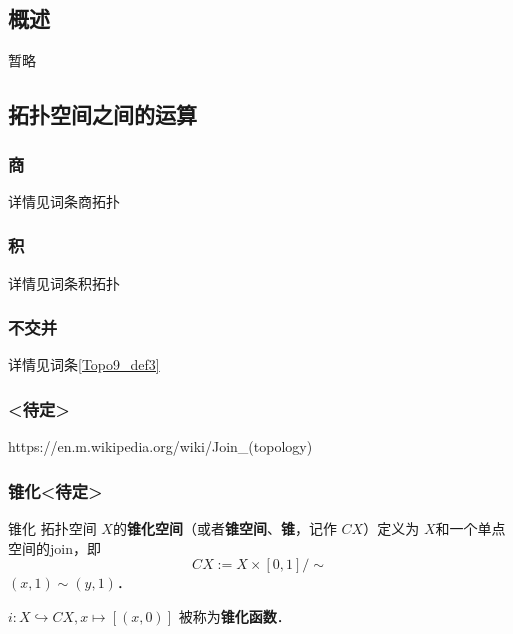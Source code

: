 
\begin{issues}
\issueDraft
\issueTODO
\issueMissDepend
\issueAbstract
\issueNeedCite
\end{issues}

\subsection{概述}

暂略

\subsection{拓扑空间之间的运算}

\subsubsection{商}

详情见词条商拓扑


\subsubsection{积}

详情见词条积拓扑


\subsubsection{不交并}

详情见词条\autoref{Topo9_def3}~


\subsubsection{<待定>}

https://en.m.wikipedia.org/wiki/Join_(topology)


\subsubsection{锥化<待定>}

\begin{definition}{锥化}
拓扑空间 $X$的\textbf{锥化空间}（或者\textbf{锥空间}、\textbf{锥}，记作 $C X$）定义为 $X$和一个单点空间的join，即
\[
    C X := X \times [0,1] / \sim
\]
$(x, 1) \sim (y, 1)$．

$i: X \hookrightarrow C X, x \mapsto [(x, 0)]$ 被称为\textbf{锥化函数}．
\end{definition}

